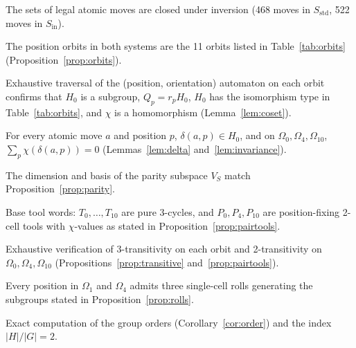 \documentclass[a4paper,11pt]{article}
\begin{document}
\begin{check}The sets of legal atomic moves are closed under inversion (468 moves in $S_{\mathrm{std}}$, 522 moves in $S_{\mathrm{in}}$).\end{check}
\begin{check}The position orbits in both systems are the 11 orbits listed in Table~\ref{tab:orbits} (Proposition~\ref{prop:orbits}).\end{check}
\begin{check}Exhaustive traversal of the (position, orientation) automaton on each orbit confirms that $H_0$ is a subgroup, $Q_p=r_pH_0$, $H_0$ has the isomorphism type in Table~\ref{tab:orbits}, and $\chi$ is a homomorphism (Lemma~\ref{lem:coset}).\end{check}
\begin{check}For every atomic move $a$ and position $p$, $\delta(a,p)\in H_0$, and on $\Omega_0,\Omega_4,\Omega_{10}$, $\sum_p\chi(\delta(a,p))=0$ (Lemmas~\ref{lem:delta} and~\ref{lem:invariance}).\end{check}
\begin{check}The dimension and basis of the parity subspace $V_S$ match Proposition~\ref{prop:parity}.\end{check}
\begin{check}Base tool words: $T_0,\dots,T_{10}$ are pure 3-cycles, and $P_0,P_4,P_{10}$ are position-fixing 2-cell tools with $\chi$-values as stated in Proposition~\ref{prop:pairtools}.\end{check}
\begin{check}Exhaustive verification of 3-transitivity on each orbit and 2-transitivity on $\Omega_0,\Omega_4,\Omega_{10}$ (Propositions~\ref{prop:transitive} and~\ref{prop:pairtools}).\end{check}
\begin{check}Every position in $\Omega_1$ and $\Omega_4$ admits three single-cell rolls generating the subgroups stated in Proposition~\ref{prop:rolls}.\end{check}
\begin{check}Exact computation of the group orders (Corollary~\ref{cor:order}) and the index $|H|/|G|=2$.\end{check}
\end{document}
